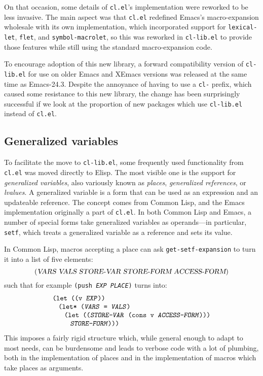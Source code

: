 \documentclass[format=acmsmall, review=false, screen=true]{acmart}
\makeatletter
\newcommand \Elisp {Elisp}
\newcommand \MAlign [1] {\begin{array}{@{}l@{}}#1\end{array}}
\makeatother
\begin{document}
On that occasion, some details of \texttt{cl.el}'s implementation were
reworked to be less invasive.  The main aspect was that \texttt{cl.el}
redefined Emacs's macro-expansion wholesale with its own implementation,
which incorporated support for \texttt{lexical-let}, \texttt{flet}, and
\texttt{symbol-macrolet}, so this was reworked in \texttt{cl-lib.el} to
provide those features while still using the standard macro-expansion code.

To encourage adoption of this new library, a forward compatibility version
of \texttt{cl-lib.el} for use on older Emacs and XEmacs versions was
released at the same time as Emacs-24.3.  Despite the annoyance of having to
use a \texttt{cl-} prefix, which caused some resistance to this new library,
the change has been surprisingly successful if we look at the proportion of
new packages which use \texttt{cl-lib.el} instead of \texttt{cl.el}.

\subsection{Generalized variables} %

To facilitate the move to \texttt{cl-lib.el}, some frequently used
functionality from \texttt{cl.el} was moved directly to \Elisp{}.  The
most visible one is the support for \emph{generalized variables}, also
variously known as \emph{places}, \emph{generalized references}, or
\emph{lvalues}.  A generalized variable is a form that can be used as
an expression and an updateable reference.  The concept comes from
Common Lisp, and the Emacs implementation originally a part of
\texttt{cl.el}.  In both Common Lisp and Emacs, a number of special
forms take generalized variables as operands---in particular,
\texttt{setf}, which treats a generalized variable as a reference and
sets its value.

In Common Lisp, macros accepting a place can ask \texttt{get-setf-expansion}
to turn it into a list of five elements:
\begin{displaymath}
  (\textsl{VARS}~\textsl{VALS}~\textsl{STORE-VAR}~\textsl{STORE-FORM}
  ~\textsl{ACCESS-FORM})
\end{displaymath}
such that for example \texttt{(push \textsl{EXP} \textsl{PLACE})} turns into:
\begin{displaymath}
  \MAlign{
    \texttt{(let ((v \textsl{EXP}))} \\
    \;\;\;\MAlign{
      \texttt{(let* (\textsl{VARS} = \textsl{VALS})} \\
      \;\;\;\MAlign{
        \texttt{(let ((\textsl{STORE-VAR} (cons v \textsl{ACCESS-FORM})))} \\
        \;\;\;\texttt{\textsl{STORE-FORM})))}}}}
\end{displaymath}
This imposes a fairly rigid structure which, while general enough to adapt
to most needs, can be burdensome and leads to verbose code with a lot
of plumbing, both in the implementation of places and in the implementation
of macros which take places as arguments.
\end{document}
